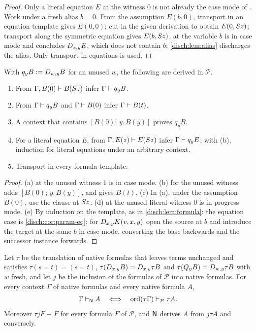 \begin{proof}
Only a literal equation $E$ at the witness $0$ is not already the case
mode of . Work under a fresh alias $b=0$. From the
assumption $E(b,0)$, transport in an equation template gives $E(0,0)$; cut
in the given derivation to obtain $E(0,S z)$; transport along the
symmetric equation gives $E(b,S z)$.  at the variable
$b$ is in case mode and concludes $D_{x,y}E$, which does not contain $b$;
\cref{disch:lem:alias} discharges the alias. Only transport in equations
is used.
\end{proof}

\begin{lemma}
\label{disch:lem:param-closure}
With $q_yB\mathrel{:=}D_{w,y}B$ for an unused $w$, the following are derived in
$\mathcal P$.
\begin{enumerate}[label=\textup{(\alph*)}]
\item From $\Gamma,B(0)\vdash B(S z)$ infer $\Gamma\vdash q_yB$.
\item From $\Gamma\vdash q_yB$ and $\Gamma\vdash B(0)$ infer
 $\Gamma\vdash B(t)$.
\item A context that contains $[B(0);\,y.\,B(y)]$ proves $q_yB$.
\item For a literal equation $E$, from $\Gamma,E(z)\vdash E(S z)$
 infer $\Gamma\vdash q_yE$; with (b), induction for literal equations
 under an arbitrary context.
\item Transport in every formula template.
\end{enumerate}
\end{lemma}

\begin{proof}
(a)  at the unused witness $1$ is in case mode. (b)
 for the unused witness adds $[B(0);\,y.\,B(y)]$, and
 gives $B(t)$. (c) In (a), under the assumption $B(0)$, use
the clause at $S z$. (d)  at the unused literal witness
$0$ is in progress mode. (e) By induction on the template, as in
\cref{disch:lem:formula}: the equation case is
\cref{disch:cor:param-eq}; for $D_{x,y}K(v,x,y)$ open the source at $b$
and introduce the target at the same $b$ in case mode, converting the base
backwards and the successor instance forwards.
\end{proof}

\begin{theorem}
\label{disch:thm:param}
Let $\tau$ be the translation of native formulas that leaves terms
unchanged and satisfies $\tau(s=t)=(s=t)$,
$\tau(D_{x,y}B)=D_{x,y}\tau B$ and $\tau(Q_{y}B)=D_{w,y}\tau B$ with
$w$ fresh, and let $j$ be the inclusion of the formulas of $\mathcal P$
into native formulas. For every context $\Gamma$ of native formulas and
every native formula $A$,
\[
 \Gamma\vdash_{\mathsf{N}}A\quad\Longleftrightarrow\quad
 \operatorname{ord}(\tau\Gamma)\vdash_{\mathcal P}\tau A .
\]
Moreover $\tau jF\equiv F$ for every formula $F$ of $\mathcal P$, and
$\mathsf{N}$ derives $A$ from $j\tau A$ and conversely.
\end{theorem}


